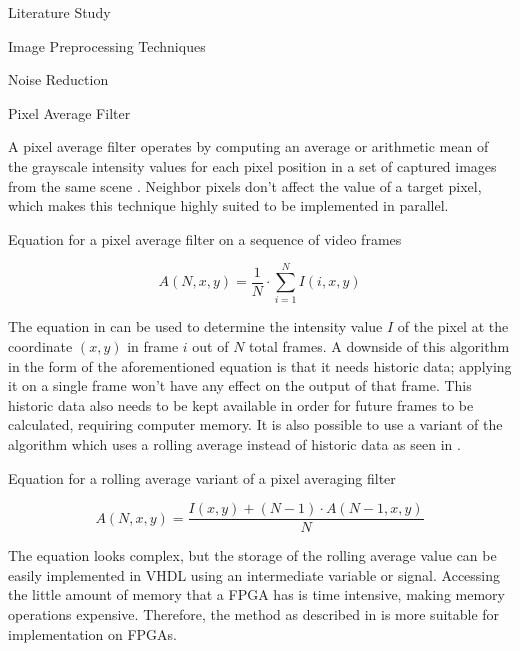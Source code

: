 \documentclass{matthijs}
\begin{document}
\begin{hoofdstuk}{Literature Study}
\begin{paragraaf}{Image Preprocessing Techniques}
\begin{subparagraaf}{Noise Reduction}
				\begin{subsubparagraaf}{Pixel Average Filter}

					A pixel average filter operates by computing an average or arithmetic mean of the grayscale intensity values for each pixel position in a set of captured images from the same scene \cite{spring2001image}.
					Neighbor pixels don't affect the value of a target pixel, which makes this technique highly suited to be implemented in parallel.
					
					\begin{figuur}{Equation for a pixel average filter on a sequence of video frames}

						\begin{equation*}
							A (N, x, y) = \frac{1}{N} \cdot \sum_{i=1}^{N} I (i, x, y)
						\end{equation*}\cite{spring2001image}
					
					\end{figuur}

					The equation in  can be used to determine the intensity value $I$ of the pixel at the coordinate $(x,y)$ in frame $i$ out of $N$ total frames.
					A downside of this algorithm in the form of the aforementioned equation is that it needs historic data; applying it on a single frame won't have any effect on the output of that frame.
					This historic data also needs to be kept available in order for future frames to be calculated, requiring computer memory.
					It is also possible to use a variant of the algorithm which uses a rolling average instead of historic data \cite{spring2001image} as seen in .

					\begin{figuur}{Equation for a rolling average variant of a pixel averaging filter}

						\begin{equation*}
							A (N, x, y) = \frac{I (x, y) + (N - 1) \cdot A (N - 1, x, y)}{N}
						\end{equation*}\cite{spring2001image}
					
					\end{figuur}

					The equation looks complex, but the storage of the rolling average value can be easily implemented in VHDL using an intermediate variable or signal.
					Accessing the little amount of memory that a FPGA has is time intensive, making memory operations expensive.
					Therefore, the method as described in  is more suitable for implementation on FPGAs.
				

\end{subsubparagraaf}
\end{subparagraaf}
\end{paragraaf}
\end{hoofdstuk}
\end{document}

